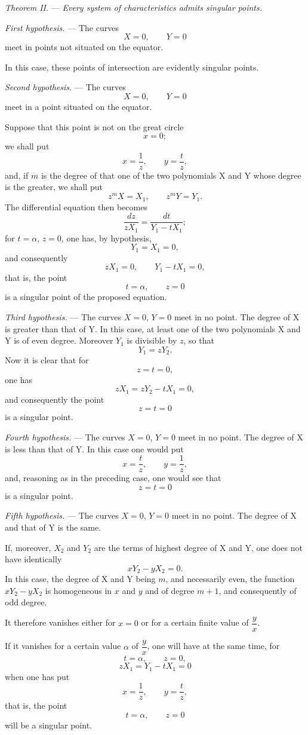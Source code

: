 \documentclass[11pt]{article}
\begin{document}
\emph{Theorem II.} --- \emph{Every system of characteristics admits singular points.}

\emph{First hypothesis.} --- The curves
\[
X=0,\qquad Y=0
\]
meet in points not situated on the equator.

In this case, these points of intersection are evidently singular points.

\emph{Second hypothesis.} --- The curves
\[
X=0,\qquad Y=0
\]
meet in a point situated on the equator.

Suppose that this point is not on the great circle
\[
x=0;
\]
we shall put
\[
x=\frac1z,\qquad y=\frac{t}{z},
\]
and, if $m$ is the degree of that one of the two polynomials X and Y whose degree is the greater, we shall put
\[
z^mX=X_1,\qquad z^mY=Y_1.
\]
The differential equation then becomes
\[
\frac{dz}{zX_1}=\frac{dt}{Y_1-tX_1};
\]
for $t=\alpha$, $z=0$, one has, by hypothesis,
\[
Y_1=X_1=0,
\]
and consequently
\[
zX_1=0,\qquad Y_1-tX_1=0,
\]
that is, the point
\[
t=\alpha,\qquad z=0
\]
is a singular point of the proposed equation.

\emph{Third hypothesis.} --- The curves $X=0$, $Y=0$ meet in no point. The degree of X is greater than that of Y. In this case, at least one of the two polynomials X and Y is of even degree. Moreover $Y_1$ is divisible by $z$, so that
\[
Y_1=zY_2.
\]
Now it is clear that for
\[
z=t=0,
\]
one has
\[
zX_1=zY_2-tX_1=0,
\]
and consequently the point
\[
z=t=0
\]
is a singular point.

\emph{Fourth hypothesis.} --- The curves $X=0$, $Y=0$ meet in no point. The degree of X is less than that of Y. In this case one would put
\[
x=\frac{t}{z},\qquad y=\frac1z,
\]
and, reasoning as in the preceding case, one would see that
\[
z=t=0
\]
is a singular point.

\emph{Fifth hypothesis.} --- The curves $X=0$, $Y=0$ meet in no point. The degree of X and that of Y is the same.

If, moreover, $X_2$ and $Y_2$ are the terms of highest degree of X and Y, one does not have identically
\[
xY_2-yX_2=0.
\]
In this case, the degree of X and Y being $m$, and necessarily even, the function $xY_2-yX_2$ is homogeneous in $x$ and $y$ and of degree $m+1$, and consequently of odd degree.

It therefore vanishes either for $x=0$ or for a certain finite value of $\dfrac yx$.

If it vanishes for a certain value $\alpha$ of $\dfrac yx$, one will have at the same time, for
\[
t=\alpha,\qquad z=0,
\]
\[
zX_1=Y_1-tX_1=0
\]
when one has put
\[
x=\frac1z,\qquad y=\frac{t}{z},
\]
that is, the point
\[
t=\alpha,\qquad z=0
\]
will be a singular point.
\end{document}
